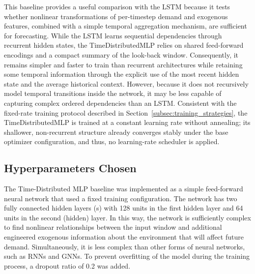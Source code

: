This baseline provides a useful comparison with the LSTM because it tests whether nonlinear transformations of per-timestep demand and exogenous features, combined with a simple temporal aggregation mechanism, are sufficient for forecasting. While the LSTM learns sequential dependencies through recurrent hidden states, the TimeDistributedMLP relies on shared feed-forward encodings and a compact summary of the look-back window. Consequently, it remains simpler and faster to train than recurrent architectures while retaining some temporal information through the explicit use of the most recent hidden state and the average historical context. However, because it does not recursively model temporal transitions inside the network, it may be less capable of capturing complex ordered dependencies than an LSTM. Consistent with the fixed-rate training protocol described in Section~\ref{subsec:training_strategies}, the TimeDistributedMLP is trained at a constant learning rate without annealing; its shallower, non-recurrent structure already converges stably under the base optimizer configuration, and thus, no learning-rate scheduler is applied.


\subsection{Hyperparameters Chosen}
\label{subsec:mlp_hyperparameters_chosen}

The Time-Distributed MLP baseline was implemented as a simple feed-forward neural network that used a fixed training configuration. The network has two fully connected hidden layers (s) with 128 units in the first hidden layer and 64 units in the second (hidden) layer. In this way, the network is sufficiently complex to find nonlinear relationships between the input window and additional engineered exogenous information about the environment that will affect future demand. Simultaneously, it is less complex than other forms of neural networks, such as RNNs and GNNs. To prevent overfitting of the model during the training process, a dropout ratio of 0.2 was added.

